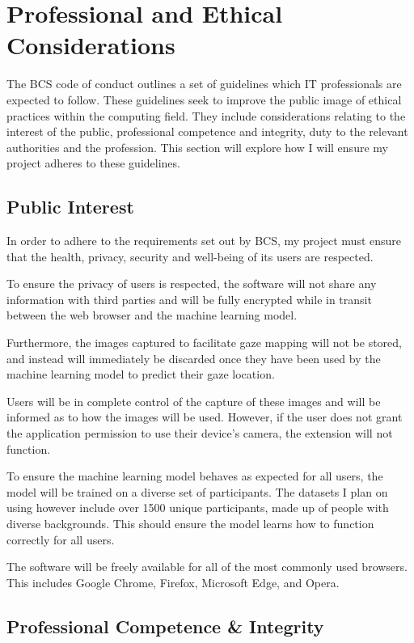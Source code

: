 \documentclass[twocolumn]{report}
\begin{document}
\chapter{Professional and Ethical Considerations}

\noindent
The BCS code of conduct \cite{bcs2022coc} outlines a set of guidelines which IT professionals are expected to follow. These guidelines seek to improve the public image of ethical practices within the computing field. They include considerations relating to the interest of the public, professional competence and integrity, duty to the relevant authorities and the profession. This section will explore how I will ensure my project adheres to these guidelines. 

\section{Public Interest}   

In order to adhere to the requirements set out by BCS, my project must ensure that the health, privacy, security and well-being of its users are respected. 

To ensure the privacy of users is respected, the software will not share any information with third parties and will be fully encrypted while in transit between the web browser and the machine learning model. 

Furthermore, the images captured to facilitate gaze mapping will not be stored, and instead will immediately be discarded once they have been used by the machine learning model to predict their gaze location.

Users will be in complete control of the capture of these images and will be informed as to how the images will be used. However, if the user does not grant the application permission to use their device's camera, the extension will not function. 

To ensure the machine learning model behaves as expected for all users, the model will be trained on a diverse set of participants. The datasets I plan on using however include over 1500 unique participants, made up of people with diverse backgrounds. This should ensure the model learns how to function correctly for all users. 

The software will be freely available for all of the most commonly used browsers. This includes Google Chrome, Firefox, Microsoft Edge, and Opera. 

\section{Professional Competence \& Integrity}   
\end{document}
